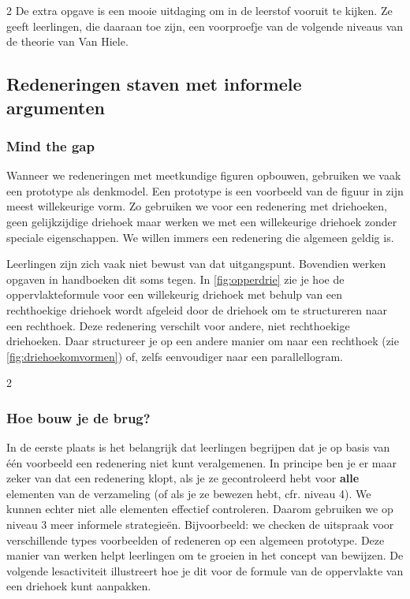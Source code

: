 \begin{multicols}{2}
De extra opgave is een mooie uitdaging om in de leerstof vooruit te kijken.
Ze geeft leerlingen, die daaraan toe zijn, een voorproefje van de volgende niveaus van de theorie van Van Hiele.

\subsection{Redeneringen staven met informele argumenten}\label{redeneringen-staven-met-informele-argumenten}

\subsubsection*{Mind the gap}

Wanneer we redeneringen met meetkundige figuren opbouwen, gebruiken we vaak een prototype als denkmodel.
Een prototype is een voorbeeld van de figuur in zijn meest willekeurige vorm.
Zo gebruiken we voor een redenering met driehoeken, geen gelijkzijdige driehoek maar werken we met een willekeurige driehoek zonder speciale eigenschappen.
We willen immers een redenering die algemeen geldig is.

Leerlingen zijn zich vaak niet bewust van dat uitgangspunt.
Bovendien werken opgaven in handboeken dit soms tegen.
In \autoref{fig:opperdrie} zie je hoe de oppervlakteformule voor een willekeurig driehoek met behulp van een rechthoekige driehoek wordt afgeleid door de driehoek om te structureren naar een rechthoek.
Deze redenering verschilt voor andere, niet rechthoekige driehoeken.
Daar structureer je op een andere manier om naar een rechthoek (zie \autoref{fig:driehoekomvormen}) of, zelfs eenvoudiger naar een parallellogram.
\end{multicols}
\begin{multicols}{2}



\subsubsection*{Hoe bouw je de brug?}

In de eerste plaats is het belangrijk dat leerlingen begrijpen dat je op basis van één voorbeeld een redenering niet kunt veralgemenen.
In principe ben je er maar zeker van dat een redenering klopt, als je ze gecontroleerd hebt voor \textbf{alle} elementen van de verzameling (of als je ze bewezen hebt, cfr. niveau 4).
We kunnen echter niet alle elementen effectief controleren.
Daarom gebruiken we op niveau 3 meer informele strategieën.
Bijvoorbeeld: we checken de uitspraak voor verschillende types voorbeelden of redeneren op een algemeen prototype.
Deze manier van werken helpt leerlingen om te groeien in het concept van bewijzen.
De volgende lesactiviteit illustreert hoe je dit voor de formule van de oppervlakte van een driehoek kunt aanpakken.
\end{multicols}
